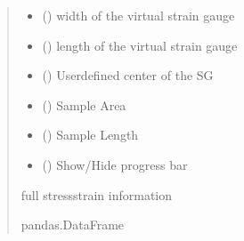 \documentclass[letterpaper,10pt,english]{sphinxmanual}
\begin{document}
\begin{fulllineitems}
\begin{fulllineitems}
\begin{quote}
\begin{description}
\begin{itemize}
\item {} 
\sphinxAtStartPar
{} () \textendash{} width of the virtual strain gauge

\item {} 
\sphinxAtStartPar
{} () \textendash{} length of the virtual strain gauge

\item {} 
\sphinxAtStartPar
{} (\sphinxstyleliteralemphasis{\sphinxupquote{{[}}}\sphinxstyleliteralemphasis{\sphinxupquote{, }}\sphinxstyleliteralemphasis{\sphinxupquote{, }}\sphinxstyleliteralemphasis{\sphinxupquote{{]}}}) \textendash{} User\sphinxhyphen{}defined center of the SG

\item {} 
\sphinxAtStartPar
{} () \textendash{} Sample Area

\item {} 
\sphinxAtStartPar
{} () \textendash{} Sample Length

\item {} 
\sphinxAtStartPar
{} () \textendash{} Show/Hide progress bar

\end{itemize}

\sphinxAtStartPar
full stress\sphinxhyphen{}strain information

\sphinxAtStartPar
pandas.DataFrame


\end{description}
\end{quote}
\end{fulllineitems}
\end{fulllineitems}
\end{document}
